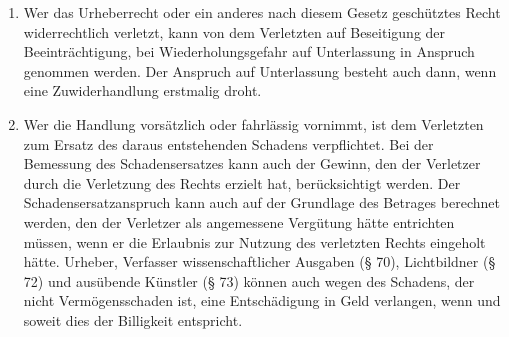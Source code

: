 \documentclass{scrreprt}
\begin{document}
\begin{enumerate}[label=(\arabic*)]
\item Wer das Urheberrecht oder ein anderes nach diesem Gesetz geschütztes Recht widerrechtlich verletzt, kann von dem Verletzten auf Beseitigung der Beeinträchtigung, bei Wiederholungsgefahr auf Unterlassung in Anspruch genommen werden. Der Anspruch auf Unterlassung besteht auch dann, wenn eine Zuwiderhandlung erstmalig droht.
\item Wer die Handlung vorsätzlich oder fahrlässig vornimmt, ist dem Verletzten zum Ersatz des daraus entstehenden Schadens verpflichtet. Bei der Bemessung des Schadensersatzes kann auch der Gewinn, den der Verletzer durch die Verletzung des Rechts erzielt hat, berücksichtigt werden. Der Schadensersatzanspruch kann auch auf der Grundlage des Betrages berechnet werden, den der Verletzer als angemessene Vergütung hätte entrichten müssen, wenn er die Erlaubnis zur Nutzung des verletzten Rechts eingeholt hätte. Urheber, Verfasser wissenschaftlicher Ausgaben (§ 70), Lichtbildner (§ 72) und ausübende Künstler (§ 73) können auch wegen des Schadens, der nicht Vermögensschaden ist, eine Entschädigung in Geld verlangen, wenn und soweit dies der Billigkeit entspricht.
\end{enumerate}
\end{document}
